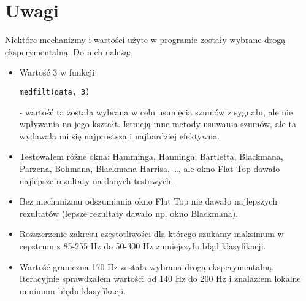 \documentclass[11pt]{article}
\begin{document}
\section{Uwagi}
Niektóre mechanizmy i wartości użyte w programie zostały wybrane drogą eksperymentalną.
Do nich należą:
\begin{itemize}
    \item Wartość 3 w funkcji \begin{verbatim}medfilt(data, 3)\end{verbatim} - wartość ta została wybrana w celu usunięcia szumów z sygnału, ale nie wpływania na jego kształt. Istnieją inne metody usuwania szumów, ale ta wydawała mi się najprostsza i najbardziej efektywna.
    \item Testowałem różne okna: Hamminga, Hanninga, Bartletta, Blackmana, Parzena, Bohmana, Blackmana-Harrisa, …, ale okno Flat Top dawało najlepsze rezultaty na danych testowych.
    \item Bez mechanizmu odszumiania okno Flat Top nie dawało najlepszych rezultatów (lepsze rezultaty dawało np. okno Blackmana).
    \item Rozszerzenie zakresu częstotliwości dla którego szukamy maksimum w cepstrum z 85-255 Hz do 50-300 Hz zmniejszyło błąd klasyfikacji.
    \item Wartość graniczna 170 Hz została wybrana drogą eksperymentalną. Iteracyjnie sprawdzałem wartości od 140 Hz do 200 Hz i znalazłem lokalne minimum błędu klasyfikacji.
\end{itemize}
\end{document}
